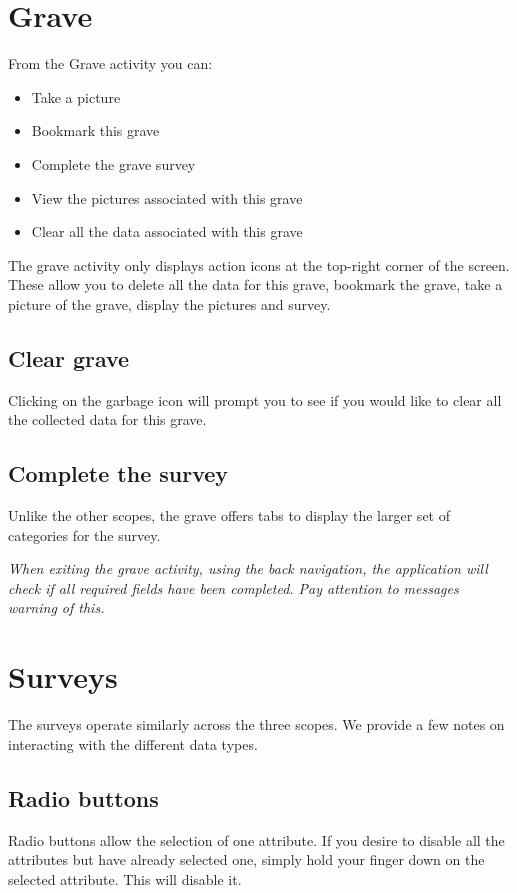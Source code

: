 \documentclass{scrreprt}
\begin{document}
\section{Grave}
From the Grave activity you can:
\begin{itemize}
\item Take a picture
\item Bookmark this grave
\item Complete the grave survey
\item View the pictures associated with this grave
\item Clear all the data associated with this grave
\end{itemize}

The grave activity only displays action icons at the top-right corner of the screen. These allow you to delete all the data for this grave, bookmark the grave, take a picture of the grave, display the pictures and survey.

\subsection{Clear grave}
Clicking on the garbage icon will prompt you to see if you would like to clear all the collected data for this grave.

\subsection{Complete the survey}
Unlike the other scopes, the grave offers tabs to display the larger set of categories for the survey.

\textit{When exiting the grave activity, using the back navigation, the application will check if all required fields have been completed. Pay attention to messages warning of this.}

\section{Surveys}
\label{au_surveys}
The surveys operate similarly across the three scopes. We provide a few notes on interacting with the different data types.

\subsection{Radio buttons}
Radio buttons allow the selection of one attribute. If you desire to disable all the attributes but have already selected one, simply hold your finger down on the selected attribute. This will disable it.
\end{document}
